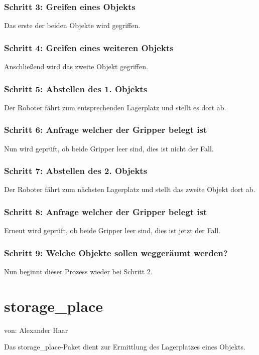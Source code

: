 \documentclass{suturo}
\makeatletter
\newcommand{\chapterauthor}[1]{%
  {\parindent0pt\vspace*{-27pt}%
  \linespread{0}\small\begin{flushright}von: #1\end{flushright}%
  \par\nobreak\vspace*{0pt}}
  \@afterheading%
}
\makeatother
\begin{document}
\subsubsection{Schritt 3: Greifen eines Objekts}
Das erste der beiden Objekte wird gegriffen.

\subsubsection{Schritt 4: Greifen eines weiteren Objekts}
Anschließend wird das zweite Objekt gegriffen.

\subsubsection{Schritt 5: Abstellen des 1. Objekts}
Der Roboter fährt zum entsprechenden Lagerplatz und stellt es dort ab.

\subsubsection{Schritt 6: Anfrage welcher der Gripper belegt ist}
Nun wird geprüft, ob beide Gripper leer sind, dies ist nicht der Fall.

\subsubsection{Schritt 7: Abstellen des 2. Objekts}
Der Roboter fährt zum nächsten Lagerplatz und stellt das zweite Objekt dort ab.

\subsubsection{Schritt 8: Anfrage welcher der Gripper belegt ist}
Erneut wird geprüft, ob beide Gripper leer sind, dies ist jetzt der Fall.

\subsubsection{Schritt 9: Welche Objekte sollen weggeräumt werden?}
Nun beginnt dieser Prozess wieder bei Schritt 2.


\section{storage\_place}
\chapterauthor{Alexander Haar}
Das storage\_place-Paket dient zur Ermittlung des Lagerplatzes eines Objekts.

\begin{figure}[!htb]
\end{figure}
      
\end{document}
